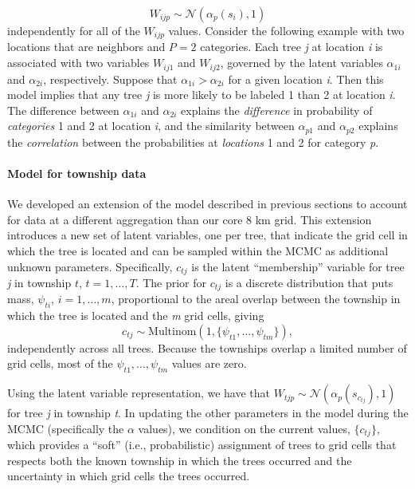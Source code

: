 \documentclass[10pt,letterpaper]{article}
\newcommand{\N}{\mathcal{N}}
\begin{document}
\noindent 
\[
W_{ijp}\sim\N(\alpha_{p}(s_{i}),1)
\]
independently for all of the $W_{ijp}$ values. Consider the following
example with two locations that are neighbors and $P=2$ categories.
Each tree \emph{j} at location \emph{i} is associated with two variables $W_{ij1}$
and $W_{ij2}$, governed by the latent variables $\alpha_{1i}$ and
$\alpha_{2i}$, respectively. Suppose that $\alpha_{1i}>\alpha_{2i}$
for a given location \emph{i}. Then this model implies that any tree \emph{j}
is more likely to be labeled 1 than 2 at location \emph{i}. The difference
between $\alpha_{1i}$ and $\alpha_{2i}$ explains the \textit{difference}
in probability of \textit{categories} 1 and 2 at location \emph{i}, and
the similarity between $\alpha_{p1}$ and $\alpha_{p2}$ explains
the \textit{correlation} between the probabilities at \textit{locations}
1 and 2 for category \emph{p}.



\paragraph*{Model for township data}
\label{sub:Model-for-township}

\linenumbers

We developed an extension of the model described in previous sections
to account for data at a different aggregation than our core 8 km
grid. This extension introduces a new set of latent variables, one
per tree, that indicate the grid cell in which the tree is located
and can be sampled within the MCMC as additional unknown parameters.
Specifically, $c_{tj}$ is the latent ``membership'' variable for
tree \emph{j} in township $t$, $t=1,\ldots,T$. The prior for $c_{tj}$
is a discrete distribution that puts mass, $\psi_{ti}$, $i=1,\ldots,m$,
proportional to the areal overlap between the township in which the
tree is located and the \emph{m} grid cells, giving 
\[
c_{tj}\sim\mbox{Multinom}(1,\{\psi_{t1},\ldots,\psi_{tm}\}),
\]
independently across all trees. Because the townships overlap a limited
number of grid cells, most of the $\psi_{t1},\ldots,\psi_{tm}$ values
are zero.

Using the latent variable representation, we have that $W_{tjp}\sim\N(\alpha_{p}(s_{c_{tj}}),1)$
for tree \emph{j} in township \emph{t}. In updating the other parameters in
the model during the MCMC (specifically the $\alpha$ values), we
condition on the current values, $\{c_{tj}\}$, which provides a ``soft''
(i.e., probabilistic) assignment of trees to grid cells that respects
both the known township in which the trees occurred and the uncertainty
in which grid cells the trees occurred.
\end{document}
